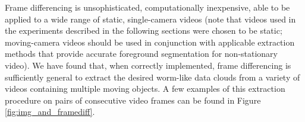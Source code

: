 \documentclass[twocolumn, final]{svjour3}
\newcommand{\willie}[1]{\textcolor{green}{\textsf{\emph{\textbf{\textcolor{green}{#1}}}}}}
\begin{document}
Frame differencing is unsophisticated, computationally inexpensive, able to be applied to a wide range of static, single-camera videos (note that videos used in the experiments described in the following sections were chosen to be static; moving-camera videos should be used in conjunction with applicable extraction methods that provide accurate foreground segmentation for non-stationary video). We have found that, when correctly implemented, frame differencing is sufficiently general to extract the desired worm-like data clouds from a variety of videos containing multiple moving objects. A few examples of this extraction procedure on pairs of consecutive video frames can be found in Figure \ref{fig:img_and_framediff}.

\end{document}
